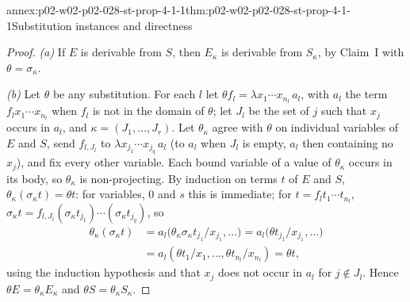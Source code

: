 \begin{annexitem}{annex:p02-w02-p02-028-st-prop-4-1-1}{thm:p02-w02-p02-028-st-prop-4-1-1}{Substitution instances and directness}
\begin{proof}
\emph{(a)}  If \(E\) is derivable from \(S\), then \(E_\kappa\) is derivable
from \(S_\kappa\), by Claim~I with \(\theta=\sigma_\kappa\).

\emph{(b)}  Let \(\theta\) be any substitution.  For each \(l\) let
\(\theta f_l=\lambda x_1\cdots x_{n_l}\,a_l\), with \(a_l\) the term
\(f_lx_1\cdots x_{n_l}\) when \(f_l\) is not in the domain of \(\theta\);
let \(J_l\) be the set of \(j\) such that \(x_j\) occurs in \(a_l\), and
\(\kappa=(J_1,\ldots,J_r)\).  Let \(\theta_\kappa\) agree with \(\theta\) on
individual variables of \(E\) and \(S\), send \(f_{l,J_l}\) to
\(\lambda x_{j_1}\cdots x_{j_q}\,a_l\) (to \(a_l\) when \(J_l\) is empty,
\(a_l\) then containing no \(x_j\)), and fix every other variable.  Each
bound variable of a value of \(\theta_\kappa\) occurs in its body, so
\(\theta_\kappa\) is non-projecting.  By induction on terms \(t\) of \(E\)
and \(S\), \(\theta_\kappa(\sigma_\kappa t)=\theta t\): for variables, \(0\)
and \(s\) this is immediate; for \(t=f_lt_1\cdots t_{n_l}\),
\(\sigma_\kappa t=f_{l,J_l}(\sigma_\kappa t_{j_1})\cdots(\sigma_\kappa t_{j_q})\),
so
\[
\begin{aligned}
 \theta_\kappa(\sigma_\kappa t)
 &=a_l\bigl(\theta_\kappa\sigma_\kappa t_{j_1}/x_{j_1},\ldots\bigr)
  =a_l\bigl(\theta t_{j_1}/x_{j_1},\ldots\bigr)\\
 &=a_l(\theta t_1/x_1,\ldots,\theta t_{n_l}/x_{n_l})=\theta t,
\end{aligned}
\]
using the induction hypothesis and that \(x_j\) does not occur in \(a_l\) for
\(j\notin J_l\).  Hence \(\theta E=\theta_\kappa E_\kappa\) and
\(\theta S=\theta_\kappa S_\kappa\).


\end{proof}
\end{annexitem}
